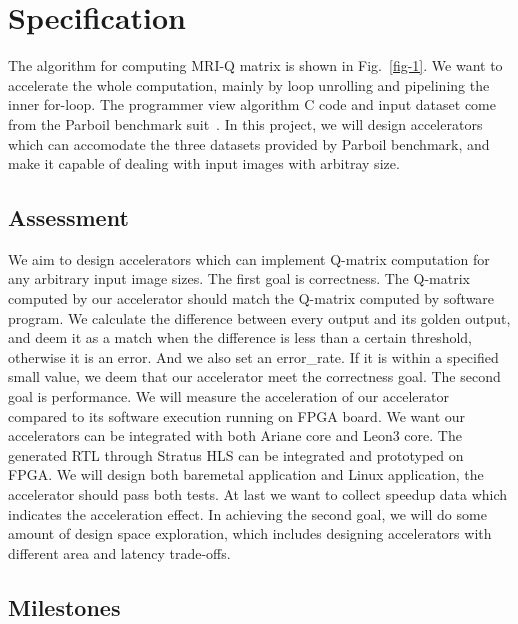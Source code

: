 \section{Specification}

The algorithm for computing MRI-Q matrix is shown in Fig.~\ref{fig-1}. We want
to accelerate the whole computation, mainly by loop unrolling and pipelining the
inner for-loop. The programmer view algorithm C code and input dataset come from
the Parboil benchmark suit~\cite{Rub1}. In this project, we will design
accelerators which can accomodate the three datasets provided by Parboil
benchmark, and make it capable of dealing with input images with arbitray size.

\subsection{Assessment}

We aim to design accelerators which can implement Q-matrix computation for any
arbitrary input image sizes. The first goal is correctness. The Q-matrix
computed by our accelerator should match the Q-matrix computed by software
program. We calculate the difference between every output and its golden output,
and deem it as a match when the difference is less than a certain threshold,
otherwise it is an error. And we also set an error\_rate. If it is within a
specified small value, we deem that our accelerator meet the correctness
goal. The second goal is performance. We will measure the acceleration of our
accelerator compared to its software execution running on FPGA board. We want
our accelerators can be integrated with both Ariane core and Leon3 core. The
generated RTL through Stratus HLS can be integrated and prototyped on FPGA. We
will design both baremetal application and Linux application, the accelerator
should pass both tests. At last we want to collect speedup data which indicates
the acceleration effect. In achieving the second goal, we will do some amount of
design space exploration, which includes designing accelerators with different
area and latency trade-offs.

\subsection{Milestones}\label{sec:arch}
\label{sec:milestones}

